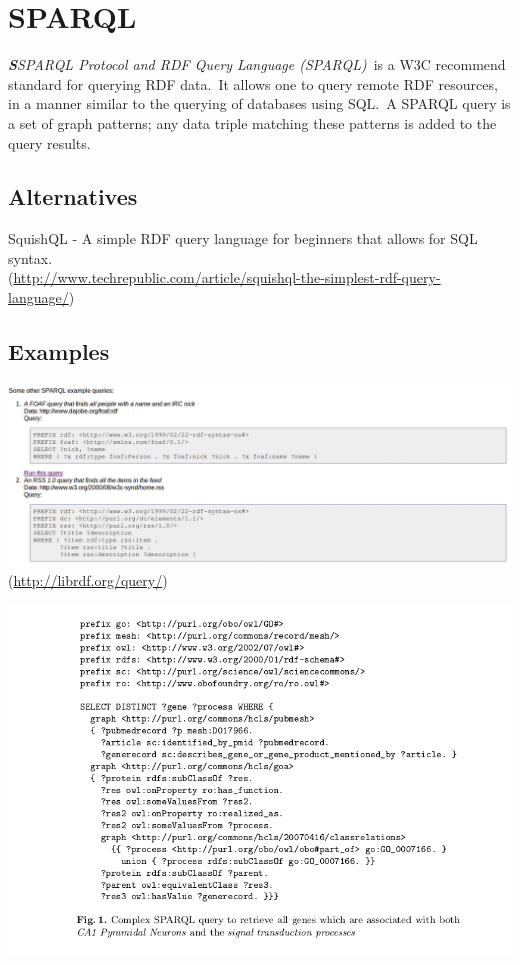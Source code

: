 \documentclass[DIV=calc, paper=a4, fontsize=12pt, onecolumn]{scrartcl}	 %
\newcommand{\initial}[1]{ %
\lettrine[lines=3,lhang=0.3,nindent=0em,slope=0em]{
\color{DarkBlue}
{\textbf{\textit{#1}}}}{}}
\begin{document}

\section[SPARQL Protocol and RDF Query Language (SPARQL)]{SPARQL}
  \label{sec:sparql}

\initial{S}\textit{SPARQL Protocol and RDF Query Language (SPARQL)}\
		is a W3C recommend standard for querying RDF data.\
		It allows one to query remote RDF resources, in a manner similar to the querying of databases using SQL.\
		A SPARQL query is a set of graph patterns; any data triple matching these patterns is added to the query results.\
                   \citep{Jarrar_mashql:_2008}     
		
		\subsection{Alternatives}

		SquishQL - A simple RDF query language for beginners that allows for SQL syntax.\\
		(\url{http://www.techrepublic.com/article/squishql-the-simplest-rdf-query-language/})\

		\subsection{Examples}

                  \includegraphics[scale=0.5]{sparql.png}\\
		 (\url{http://librdf.org/query/})

  		   \includegraphics[scale=0.5]{sparql1.png}
 		  \citep{stenzhorn2008simplifying}\\
\end{document}
